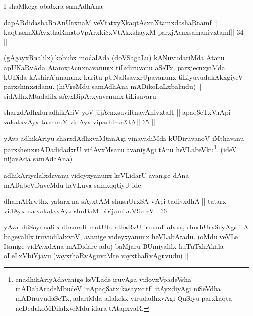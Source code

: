 \begin{artha}
I shaMkege obabxra samAdhAna -
\end{artha}

\begin{shl}
dapARdidashaRnAnUnxnaM veVtatxyXkaqtAsxnXtamxdashaRnamf ||
kaqtasxnXtAvxthaRmatoV\s pArxkiSxVtAkxshayxM parxjAcnxsamanivxtamf\hfill || 34 ||
\end{shl}

\begin{artha}
(gAgayxRnalilx) kobubx modalAda (doVSagaLu) kANuvudariMda Atanu apUNaRvAda AtamxjAcnxnavanunx tiLidiruvanu aSeTx. parxjecnxyiMda kUDida kAshirAjananunx kuritu pUNaRsavxrUpavanunx tiLiyuvudakAkxgiyeV parxshinxsidanu. (hiVgeMdu samAdhAna mADikoLaLxbahudu) || sidAdhxMtadalilx sAvxBipArxyavanunx tiLisuvaru -
\end{artha}

\begin{shl}
sharxdAdhxluradhikAriV yoV jijAcnxsuviRnayAnivxtaH ||
apaqSeTxVnApi vakatxvAyx tasemxY vidAyx vipashirxcXtA\hfill || 35 ||
\end{shl}

\begin{artha}
yAva adhikAriyu sharxdAdhxvaMtanAgi vinayadiMda kUDiruvanoV iMthavanu parxshenxmADadidadxrU vidAvxMsanu avanigAgi tAnu heVLabeVku\footnote[5]{anadhikAriyAdavanige keVLade iruvAga vidoyxVpadeVsha mADabAradeMbudeV `nApaqSatx:kasayxcitf' itAyxdiyAgi niSeVdha mADiruvudaSeTx, adariMda adakekx virudadhxvAgi QuSiyu parxkaqta neDedukoMDilalxveMdu idara tAtapxyaR.}. (ideV nijavAda samAdhAna) ||
\end{artha}

\begin{artha}
adhikAriyalalxdavanu videyxyanunx keVLidarU avanige dAna mADabeVDaveMdu heVLuva samxqqtiyU ide ---
\end{artha}

\begin{shl}
dhamARrwthx yatarx na sAyxtAM shushUrxSA vA\s pi tadivxdhA ||
tatarx vidAyx na vakatxvAyx shuBaM biVjamivoVSareV\hfill || 36 ||
\end{shl}

\begin{artha}
yAva shiSayxnalilx dhamaR matUtx athaRvU iruvudilalxvo, shushUrxSeyAgali A bageyalilx iruvudilalxvoV, avanige videyxyanunx heVLabAradu. (oMdu veVLe Itanige vidAyxdAna mADidare adu) baMjaru BUmiyalilx huTuTxhAkida oLeLxVbiVjavu (vayxthaRvAguvaMte vayxthaRvAguvudu) ||
\end{artha} 
 
